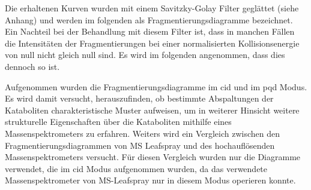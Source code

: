Die erhaltenen Kurven wurden mit einem Savitzky-Golay Filter geglättet (siehe Anhang) und werden im folgenden als Fragmentierungsdiagramme bezeichnet. Ein Nachteil bei der Behandlung mit diesem Filter ist, dass in manchen Fällen die Intensitäten der Fragmentierungen bei einer normalisierten Kollisionsenergie von null nicht gleich null sind. Es wird im folgenden angenommen, dass dies dennoch so ist.

Aufgenommen wurden die Fragmentierungsdiagramme im \gls{cid} und im \gls{pqd} Modus.\\

Es wird damit versucht, herauszufinden, ob bestimmte Abspaltungen der Kataboliten charakteristische Muster aufweisen, um in weiterer Hinsicht weitere strukturelle Eigenschaften über die Kataboliten mithilfe eines Massenspektrometers zu erfahren. Weiters wird ein Vergleich zwischen den Fragmentierungsdiagrammen von MS Leafspray und des hochauflösenden Massenspektrometers versucht. Für diesen Vergleich wurden nur die Diagramme verwendet, die im \gls{cid} Modus aufgenommen wurden, da das verwendete Massenspektrometer von MS-Leafspray nur in diesem Modus operieren konnte.